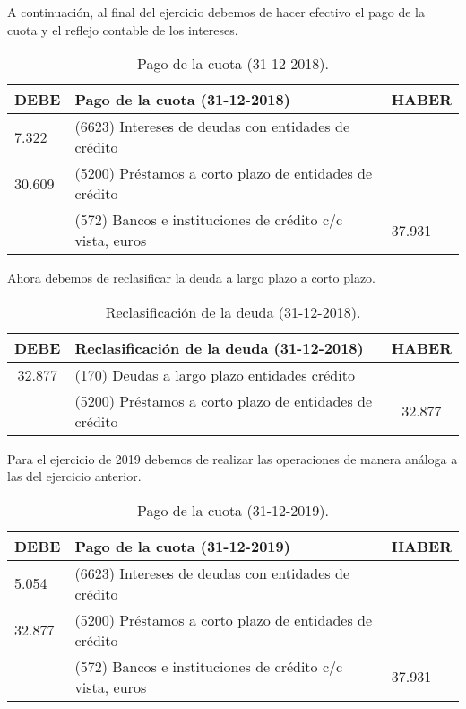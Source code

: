 A continuación, al final del ejercicio debemos de hacer efectivo el pago de la cuota y el reflejo contable de los intereses.
 
\begin{table}[H]
    \centering
    \begin{tabular}{|p{2cm}|p{6cm}|p{2cm}|}
        \hline
        \rowcolor{blue!30}
        \textbf{DEBE} & \textbf{Pago de la cuota (31-12-2018)} & \textbf{HABER} \\
        \hline
        7.322 & (6623) Intereses de deudas con entidades de crédito & \\
        \hline
        30.609 & (5200) Préstamos a corto plazo de entidades de crédito & \\
        \hline
        & (572) Bancos e instituciones de crédito c/c vista, euros & 37.931 \\
        \hline
    \end{tabular}
    \caption{Pago de la cuota (31-12-2018).}
    \label{tabla:pago_cuota_2018}
\end{table}

Ahora debemos de reclasificar la deuda a largo plazo a corto plazo.

\begin{table}[H]
    \centering
    \begin{tabular}{|c|p{6cm}|c|}
        \hline
        \rowcolor{blue!30}
        \textbf{DEBE} & \textbf{Reclasificación de la deuda (31-12-2018)} & \textbf{HABER} \\
        \hline
        32.877 & (170) Deudas a largo plazo entidades crédito & \\
        \hline
        & (5200) Préstamos a corto plazo de entidades de crédito & 32.877 \\
        \hline
    \end{tabular}
    \caption{Reclasificación de la deuda (31-12-2018).}
    \label{tabla:reclasificacion_deuda}
\end{table}

Para el ejercicio de 2019 debemos de realizar las operaciones de manera análoga a las del ejercicio anterior.

\begin{table}[H]
    \centering
    \begin{tabular}{|p{2cm}|p{6cm}|p{2cm}|}
        \hline
        \rowcolor{blue!30}
        \textbf{DEBE} & \textbf{Pago de la cuota (31-12-2019)} & \textbf{HABER} \\
        \hline
        5.054 & (6623) Intereses de deudas con entidades de crédito & \\
        \hline
        32.877 & (5200) Préstamos a corto plazo de entidades de crédito & \\
        \hline
        & (572) Bancos e instituciones de crédito c/c vista, euros & 37.931 \\
        \hline
    \end{tabular}
    \caption{Pago de la cuota (31-12-2019).}
    \label{tabla:pago_cuota_2019}
\end{table}

